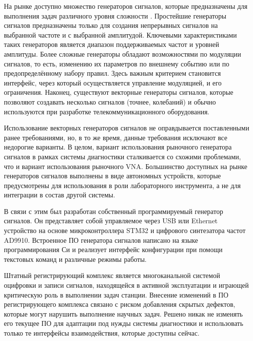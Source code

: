 \documentclass{report}
\begin{document}

На рынке доступно множество генераторов сигналов, которые предназначены для выполнения задач различного уровня сложности \cite{siggen1} \cite{siggen2}. Простейшие генераторы сигналов предназначены только для создания непрерывных сигналов на выбранной частоте и с выбранной амплитудой. Ключевыми характеристиками таких генераторов является диапазон поддерживаемых частот и уровней амплитуды. Более сложные генераторы обладают возможностями по модуляции сигналов, то есть, изменению их параметров по внешнему событию или по предопределённому набору правил. Здесь важным критерием становится интерфейс, через который осуществляется управление модуляцией, и его ограничения. Наконец, существуют векторные генераторы сигналов, которые позволяют создавать несколько сигналов (точнее, колебаний) и обычно используются при разработке телекоммуникационного оборудования.

Использование векторных генераторов сигналов не оправдывается поставленными ранее требованиями, но, в то же время, данные требования исключают все недорогие варианты. В целом, вариант использования рыночного генератора сигналов в рамках системы диагностики сталкивается со схожими проблемами, что и вариант использования рыночного VNA. Большинство доступных на рынке генераторов сигналов выполнены в виде автономных устройств, которые предусмотрены для использования в роли лабораторного инструмента, а не для интеграции в состав другой системы.

В связи с этим был разработан собственный программируемый генератор сигналов. Он представляет собой управляемое через USB или Ethernet устройство на основе микроконтроллера STM32 и цифрового синтезатора частот AD9910. Встроенное ПО генератора сигналов написано на языке программирования Си и реализует интерфейс конфигурации при помощи текстовых команд и различные режимы работы.

Штатный регистрирующий комплекс является многоканальной системой оцифровки и записи сигналов, находящейся в активной эксплуатации и играющей критическую роль в выполнении  задач станции. Внесение изменений в ПО регистрирующего комплекса связано с риском добавления скрытых дефектов, которые могут нарушить выполнение научных задач. Решено никак не изменять его текущее ПО для адаптации под нужды системы диагностики и использовать только те интерфейсы взаимодействия, которые доступны сейчас.
\end{document}
